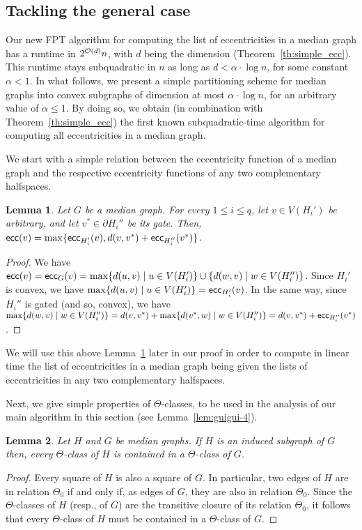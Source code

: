 \documentclass{article}
\newtheorem{lemma}{Lemma}
\newcommand{\ecc}{\mbox{\textsf{ecc}}}
\begin{document}
\subsection{Tackling the general case} \label{subsec:reduction}

Our new FPT algorithm for computing the list of eccentricities in a median graph has a runtime in $2^{{\cal O}(d)}n$, with $d$ being the dimension (Theorem~\ref{th:simple_ecc}). 
This runtime stays subquadratic in $n$ as long as $d < \alpha \cdot \log{n}$, for some constant $\alpha < 1$.
In what follows, we present a simple partitioning scheme for median graphs into convex subgraphs of dimension at most $\alpha \cdot \log{n}$, for an arbitrary value of $\alpha \leq 1$.
By doing so, we obtain (in combination with Theorem~\ref{th:simple_ecc}) the first known subquadratic-time algorithm for computing all eccentricities in a median graph.

We start with a simple relation between the eccentricity function of a median graph and the respective eccentricity functions of any two complementary halfspaces.

\begin{lemma}\label{lem:guigui-1}
Let $G$ be a median graph.
For every $1 \leq i \leq q$, let $v \in V(H_i')$ be arbitrary, and let $v^* \in \partial H_i''$ be its gate.
Then, $\ecc(v) = \max\{\ecc_{H_i'}(v), d(v,v^*) + \ecc_{H_i''}(v^*)\}$.
\end{lemma}
\begin{proof}
We have $\ecc(v) = \ecc_G(v) = \max\{d(u,v) \mid u \in V(H_i')\} \cup \{d(w,v) \mid w \in V(H_i'')\}$.
Since $H_i'$ is convex, we have $\max\{d(u,v) \mid u \in V(H_i')\} = \ecc_{H_i'}(v)$.
In the same way, since $H_i''$ is gated (and so, convex), we have $\max\{d(w,v) \mid w \in V(H_i'')\} = d(v,v^*) + \max\{d(v^*,w) \mid w \in V(H_i'')\} = d(v,v^*) + \ecc_{H_i''}(v^*)$.
\end{proof}
We will use this above Lemma~\ref{lem:guigui-1} later in our proof in order to compute in linear time the list of eccentricities in a median graph being given the lists of eccentricities in any two complementary halfspaces.

Next, we give simple properties of $\Theta$-classes, to be used in the analysis of our main algorithm in this section (see Lemma~\ref{lem:guigui-4}).

\begin{lemma}\label{lem:guigui-2}
Let $H$ and $G$ be median graphs.
If $H$ is an induced subgraph of $G$ then, every $\Theta$-class of $H$ is contained in a $\Theta$-class of $G$.
\end{lemma}
\begin{proof}
Every square of $H$ is also a square of $G$.
In particular, two edges of $H$ are in relation $\Theta_0$ if and only if, as edges of $G$, they are also in relation $\Theta_0$.
Since the $\Theta$-classes of $H$ (resp., of $G$) are the transitive closure of its relation $\Theta_0$, it follows that every $\Theta$-class of $H$ must be contained in a $\Theta$-class of $G$.
\end{proof}
\end{document}
